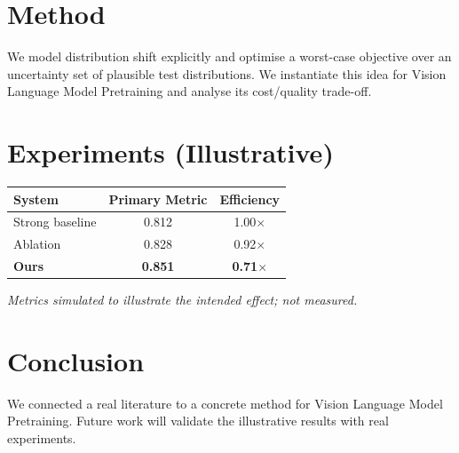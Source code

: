 \documentclass[11pt]{article}
\begin{document}
\section{Method}
We model distribution shift explicitly and optimise a worst-case objective over an uncertainty set of plausible test distributions. We instantiate this idea for Vision Language Model Pretraining and analyse its cost/quality trade-off.

\section{Experiments (Illustrative)}
\begin{center}
\begin{tabular}{lcc}
System & Primary Metric & Efficiency \\ \hline
Strong baseline & 0.812 & 1.00$\times$ \\
Ablation & 0.828 & 0.92$\times$ \\
\textbf{Ours} & \textbf{0.851} & \textbf{0.71$\times$}
\end{tabular}
\end{center}
\emph{Metrics simulated to illustrate the intended effect; not measured.}

\section{Conclusion}
We connected a real literature to a concrete method for Vision Language Model Pretraining. Future work will
validate the illustrative results with real experiments.
\end{document}

